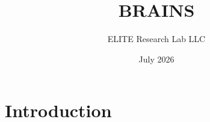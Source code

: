 \documentclass{article}
\title{BRAINS}
\author{ELITE Research Lab LLC}
\date{July 2026}
\begin{document}
\maketitle

\section{Introduction}
\end{document}
